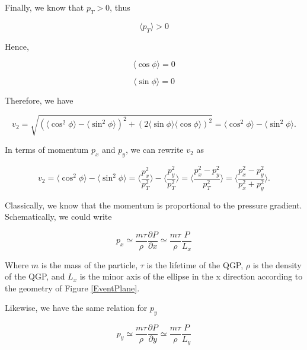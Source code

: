 Finally, we know that $p_T > 0$, thus   
 
\begin{equation}
\langle p_T \rangle > 0
\end{equation}  
 
Hence,  


\begin{equation}
\langle \cos \phi \rangle =  0
\end{equation} 


\begin{equation}
\langle \sin \phi \rangle =  0
\end{equation}

Therefore, we have 

\begin{equation}
v_2 = \sqrt{(\langle \cos^2 \phi \rangle - \langle \sin^2 \phi \rangle)^2 + (2  \langle \sin \phi \rangle \langle \cos \phi \rangle)^2} = \langle \cos^2 \phi \rangle - \langle \sin^2 \phi \rangle. 
\end{equation}

In terms of momentum $p_x$ and $p_y$, we can rewrite $v_2$ as 

\begin{equation}
v_2 =  \langle \cos^2 \phi \rangle - \langle \sin^2 \phi \rangle = \langle\frac{p_x^2}{p_T^2} \rangle - \langle \frac{p_y^2}{p_T^2} \rangle = \langle \frac{p_x^2 - p_y^2}{p_T^2} \rangle = \langle \frac{p_x^2 - p_y^2}{p_x^2 + p_y^2} \rangle. 
\end{equation}

Classically, we know that the momentum is proportional to the pressure gradient. Schematically, we could write

\begin{equation}
p_x \simeq \frac{m\tau}{\rho}\frac{\partial P}{\partial x} \simeq \frac{m\tau}{\rho}\frac{P}{L_x}
\end{equation}

Where $m$ is the mass of the particle, $\tau$ is the lifetime of the QGP, $\rho$ is the density of the QGP, and $L_x$ is the minor axis of the ellipse in the x direction according to the geometry of Figure \ref{EventPlane}.

Likewise, we have the same relation for $p_y$

\begin{equation}
p_y \simeq \frac{m\tau}{\rho}\frac{\partial P}{\partial y} \simeq \frac{m\tau}{\rho}\frac{ P}{L_y}
\end{equation} 

